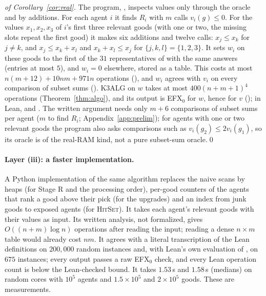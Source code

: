 \documentclass[runningheads,11pt]{llncs}
\newcommand{\efxz}{\texorpdfstring{\mbox{EFX$_0$}}{EFX0}}
\begin{document}
\begin{proof}[of Corollary~\ref{cor:real}]
The program, , inspects values only through the oracle and by additions. For each agent $i$ it finds $R_i$ with $m$ calls $v_i(g)\le0$. For the values $x_1,x_2,x_3$ of $i$'s first three relevant goods (with one or two, the missing slots repeat the first good) it makes six additions and twelve calls: $x_j\le x_k$ for $j\ne k$, and $x_j\le x_k+x_l$ and $x_k+x_l\le x_j$ for $\{j,k,l\}=\{1,2,3\}$. It sets $w_i$ on these goods to the first of the $31$ representatives of  with the same answers (entries at most $5$), and $w_i=0$ elsewhere, stored as a table. This costs at most $n(m+12)+10nm+971n$ operations (), and $w_i$ agrees with $v_i$ on every comparison of subset sums (). K3ALG on $w$ takes at most $400(n+m+1)^4$ operations (Theorem~\ref{thm:algo}), and its output is \efxz{} for $w$, hence for $v$ (); in Lean,  and . The written argument needs only $m+6$ comparisons of subset sums per agent ($m$ to find $R_i$; Appendix~\ref{app:prelim}); for agents with one or two relevant goods the program also asks comparisons such as $v_i(g_2)\le2v_i(g_1)$, so its oracle is of the real-RAM kind, not a pure subset-sum oracle.\qed
\end{proof}

\paragraph{Layer (iii): a faster implementation.} A Python implementation of the same algorithm replaces the naive scans by heaps (for Stage R and the processing order), per-good counters of the agents that rank a good above their pick (for the upgrades) and an index from junk goods to exposed agents (for \textsc{HitSet}). It takes each agent's relevant goods with their values as input. Its written analysis, not formalized, gives $O((n+m)\log n)$ operations after reading the input; reading a dense $n\times m$ table would already cost $nm$. It agrees with a literal transcription of the Lean definitions on $200{,}000$ random instances and, with Lean's own evaluation of , on $675$ instances; every output passes a raw \efxz{} check, and every Lean operation count is below the Lean-checked bound. It takes $1.53$\,s and $1.58$\,s (medians) on random cores with $10^5$ agents and $1.5\times10^5$ and $2\times10^5$ goods. These are measurements.
\end{document}

